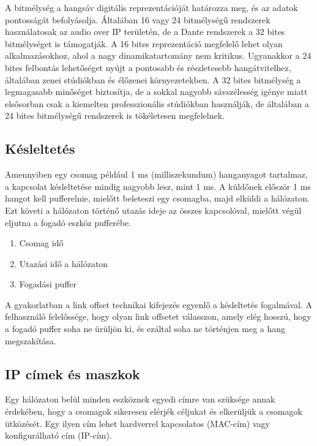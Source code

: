 A bitmélység a hangsáv digitális reprezentációját határozza meg, és az adatok pontosságát befolyásolja.
Általában 16 vagy 24 bitmélységű rendszerek használatosak az audio over IP területén, de a Dante rendszerek a 
32 bites bitmélységet is támogatják. A 16 bites reprezentáció megfelelő lehet olyan alkalmazásokhoz, ahol a nagy
dinamikatartomány nem kritikus. Ugyanakkor a 24 bites felbontás lehetőséget nyújt a pontosabb és részletesebb hangátvitelhez,
általában zenei stúdiókban és élőzenei környezetekben. 
A 32 bites bitmélység a legmagasabb minőséget biztosítja, de a sokkal nagyobb sávszélesség igénye miatt elsősorban csak
a kiemelten professzionális stúdiókban használják, de általában a 24 bites bitmélységű rendszerek is tökéletesen megfelelnek.
\subsection{Késleltetés}
Amennyiben egy csomag például 1 ms (milliszekundum) hanganyagot tartalmaz, a kapcsolat
késleltetése mindig nagyobb lesz, mint 1 ms.
A küldőnek először 1 ms hangot kell pufferelnie, mielőtt beleteszi egy csomagba, majd elküldi a hálózaton.
Ezt követi a hálózaton történő utazás ideje az összes kapcsolóval, mielőtt végül eljutna a fogadó eszköz pufferébe.
\begin{enumerate}
    \item Csomag idő
    \item Utazási idő a hálózaton
    \item Fogadási puffer
\end{enumerate}
A gyakorlatban a link offset technikai kifejezés egyenlő a késleltetés fogalmával.
A felhasználó felelőssége, hogy olyan link offsetet válasszon, amely elég hosszú, hogy a fogadó puffer soha ne ürüljön ki, és
ezáltal soha ne történjen meg a hang megszakítása. 
\subsection{IP címek és maszkok}
Egy hálózaton belül minden eszköznek egyedi címre van szüksége annak érdekében,
hogy a csomagok sikeresen elérjék céljukat és elkerüljük a csomagok ütközését.
Egy ilyen cím lehet hardverrel kapcsolatos (MAC-cím) vagy konfigurálható cím (IP-cím).
